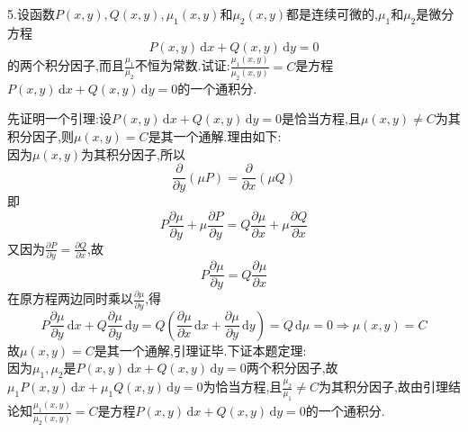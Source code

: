 \documentclass[titlepage,11pt,a4paper,twoside]{report}
\makeatletter
\newcommand\diff{\,\mathrm{d}}
\renewenvironment{proof}{\par
	\pushQED{\qed}%
	\normalfont \topsep1\p@\@plus6\p@\relax
	\trivlist
	\item\relax
	{\hspace*{\parindent}{\heiti 证明}\@addpunct{:}}\hspace\labelsep\ignorespaces
}{%
	\popQED\endtrivlist\@endpefalse
}
\makeatother
\begin{document}
5.设函数$P(x,y),Q(x,y),\mu_1(x,y)$和$\mu_2(x,y)$都是连续可微的,$\mu_1$和$\mu_2$是微分方程
\[P(x,y)\diff x+Q(x,y)\diff y=0\]
的两个积分因子,而且$\frac{\mu_1}{\mu_2}$不恒为常数.试证:$\frac{\mu_1(x,y)}{\mu_2(x,y)}=C$是方程$P(x,y)\diff x+Q(x,y)\diff y=0$的一个通积分.
\begin{proof}先证明一个引理:设$P(x,y)\diff x+Q(x,y)\diff y=0$是恰当方程,且$\mu(x,y)\neq C$为其积分因子,则$\mu(x,y)=C$是其一个通解.理由如下:\\
因为$\mu(x,y)$为其积分因子,所以
\[\frac{\partial}{\partial y}(\mu P)=\frac{\partial}{\partial x}(\mu Q)\]
即\[P\frac{\partial\mu}{\partial y}+\mu\frac{\partial P}{\partial y}=Q\frac{\partial\mu}{\partial x}+\mu\frac{\partial Q}{\partial x}\]
又因为$\frac{\partial P}{\partial y}=\frac{\partial Q}{\partial x}$,故
\[P\frac{\partial\mu}{\partial y}=Q\frac{\partial\mu}{\partial x}\]
在原方程两边同时乘以$\frac{\partial\mu}{\partial y}$,得
\[
P\frac{\partial\mu}{\partial y}\diff x+Q\frac{\partial\mu}{\partial y}\diff y
=Q\left(\frac{\partial\mu}{\partial x}\diff x+\frac{\partial\mu}{\partial y}\diff y\right)
=Q\diff\mu=0\Rightarrow\mu(x,y)=C\]
故$\mu(x,y)=C$是其一个通解,引理证毕.下证本题定理:\\
因为$\mu_1,\mu_2$是$P(x,y)\diff x+Q(x,y)\diff y=0$两个积分因子,故$\mu_1P(x,y)\diff x+\mu_1Q(x,y)\diff y=0$为恰当方程,且$\frac{\mu_2}{\mu_1}\neq C$为其积分因子,故由引理结论知$\frac{\mu_1(x,y)}{\mu_2(x,y)}=C$是方程$P(x,y)\diff x+Q(x,y)\diff y=0$的一个通积分.
\end{proof}
\end{document}
